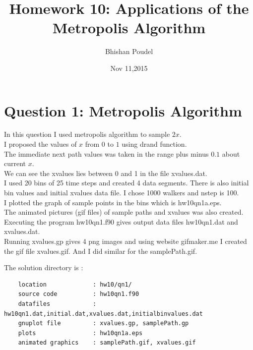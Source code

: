 \documentclass[11pt,a4paper,english]{article}
\title{Homework 10: Applications of the Metropolis Algorithm}
\author{Bhishan Poudel}
\date{Nov 11,2015}
\begin{document}
\maketitle
\tableofcontents
\listoffigures
\clearpage


\section{Question 1: Metropolis Algorithm }
In this question I used metropolis algorithm to sample $2x$.\\
I proposed the values of $x$ from $0$ to $1$ using drand function.\\
The immediate next path values was taken in the range plus minus $0.1$ about current $x$.\\
We can see the xvalues lies between 0 and 1 in the file xvalues.dat.\\
I used 20 bins of 25 time steps and created 4 data segments. There is also
initial bin values and initial xvalues data file.
I chose 1000 walkers and nstep is 100.\\

I plotted the graph of sample points in the bins which is hw10qn1a.eps.\\
The animated pictures (gif files) of sample paths and xvalues was also created.\\
Executing the program hw10qn1.f90 gives output data files hw10qn1.dat and xvalues.dat.\\
Running xvalues.gp gives 4 png images and using website gifmaker.me I created the gif file xvalues.gif.
And I did similar for the samplePath.gif.

	The solution directory is :\\
	\begin{verbatim}
	location             : hw10/qn1/ 
	source code          : hw10qn1.f90
	datafiles            : hw10qn1.dat,initial.dat,xvalues.dat,initialbinvalues.dat
	gnuplot file         : xvalues.gp, samplePath.gp
	plots                : hw10qn1a.eps
	animated graphics    : samplePath.gif, xvalues.gif
	\end{verbatim}
 
\end{document}
